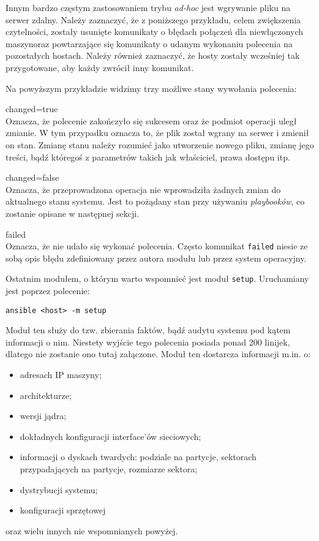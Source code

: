 Innym bardzo częstym zastosowaniem trybu \textit{ad-hoc} jest wgrywanie pliku na serwer zdalny.
Należy zaznaczyć, że z poniższego przykładu, celem zwiększenia czytelności, zostały usunięte komunikaty o błędach połączeń dla niewłączonych maszynoraz powtarzające się komunikaty o udanym wykonaniu polecenia na pozostałych hostach.
Należy również zaznaczyć, że hosty zostały wcześniej tak przygotowane, aby każdy zwrócił inny komunikat.

Na powyższym przykładzie widzimy trzy możliwe stany wywołania polecenia:
\begin{description}
	\item{changed=true}\\
		Oznacza, że polecenie zakończyło się sukcesem oraz że podmiot operacji uległ zmianie. W tym przypadku oznacza to, że plik został wgrany na serwer i zmienił on stan.
		Zmianę stanu należy rozumieć jako utworzenie nowego pliku, zmianę jego treści, bądź któregoś z parametrów takich jak właściciel, prawa dostępu itp.
	\item{changed=false}\\
		Oznacza, że przeprowadzona operacja nie wprowadziła żadnych zmian do aktualnego stanu systemu.
		Jest to pożądany stan przy używaniu \textit{playbooków}, co zostanie opisane w następnej sekcji.
	\item{failed}\\
		Oznacza, że nie udało się wykonać polecenia.
		Często komunikat \texttt{failed} niesie ze sobą opis błędu zdefiniowany przez autora modułu lub przez system operacyjny.
\end{description}
Ostatnim modułem, o którym warto wspomnieć jest moduł \texttt{setup}. Uruchamiany jest poprzez polecenie:
\begin{lstlisting}
ansible <host> -m setup
\end{lstlisting}
Moduł ten służy do tzw. zbierania faktów, bądź audytu systemu pod kątem informacji o nim.
Niestety wyjście tego polecenia posiada ponad 200 linijek, dlatego nie zostanie ono tutaj załączone.
Moduł ten dostarcza informacji m.in. o:
\begin{itemize}
	\item adresach IP maszyny;
	\item architekturze;
	\item wersji jądra;
	\item dokładnych konfiguracji interface'ów sieciowych;
	\item informacji o dyskach twardych: podziale na partycje, sektorach przypadających na partycje, rozmiarze sektora;
	\item dystrybucji systemu;
	\item konfiguracji sprzętowej
\end{itemize}
oraz wielu innych nie wspomnianych powyżej.
